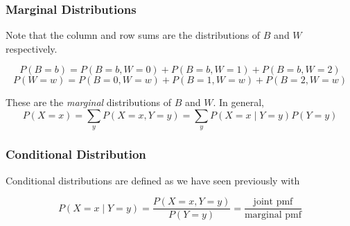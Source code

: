\documentclass[slidestop,compress,mathserif]{beamer}
\begin{document}

\begin{frame}
\frametitle{Marginal Distributions}

Note that the column and row sums are the distributions of $B$ and $W$ respectively.

{\footnotesize
\[P(B=b) = P(B=b,W=0)+P(B=b,W=1)+P(B=b,W=2)\]
\[P(W=w) = P(B=0,W=w)+P(B=1,W=w)+P(B=2,W=w)\]
}

\pause
These are the \emph{marginal} distributions of $B$ and $W$. In general,
\[ P(X=x) = \sum_y P(X=x,Y=y) = \sum_y P(X=x \mid Y=y)P(Y=y)\]

\end{frame}




\begin{frame}
\frametitle{Conditional Distribution}

Conditional distributions are defined as we have seen previously with

\[ P(X=x \mid Y=y) = \frac{P(X=x,Y=y)}{P(Y=y)} = \frac{\text{joint pmf}}{\text{marginal pmf}} \]

\end{frame}
\end{document}
